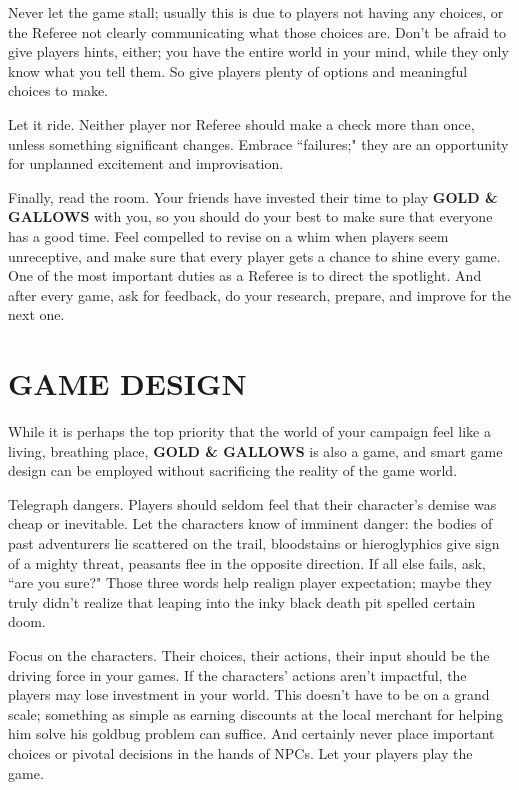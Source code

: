 \documentclass[twoside]{article}
\begin{document}
\bigbreak

Never let the game stall; usually this is due to players not having any choices, or the Referee not clearly communicating what those choices are. Don't be afraid to give players hints, either; you have the entire world in your mind, while they only know what you tell them. So give players plenty of options and meaningful choices to make.

\bigbreak

Let it ride. Neither player nor Referee should make a check more than once, unless something significant changes. Embrace ``failures;" they are an opportunity for unplanned excitement and improvisation. 


\bigbreak

Finally, read the room. Your friends have invested their time to play \textbf{GOLD \& GALLOWS} with you, so you should do your best to make sure that everyone has a good time. Feel compelled to revise on a whim when players seem unreceptive, and make sure that every player gets a chance to shine every game. One of the most important duties as a Referee is to direct the spotlight. And after every game, ask for feedback, do your research, prepare, and improve for the next one.

\section*{GAME DESIGN}

While it is perhaps the top priority that the world of your campaign feel like a living, breathing place, \textbf{GOLD \& GALLOWS} is also a game, and smart game design can be employed without sacrificing the reality of the game world.

\bigbreak

Telegraph dangers. Players should seldom feel that their character's demise was cheap or inevitable. Let the characters know of imminent danger: the bodies of past adventurers lie scattered on the trail, bloodstains or hieroglyphics give sign of a mighty threat, peasants flee in the opposite direction. If all else fails, ask, ``are you sure?" Those three words help realign player expectation; maybe they truly didn't realize that leaping into the inky black death pit spelled certain doom.

\bigbreak

Focus on the characters. Their choices, their actions, their input should be the driving force in your games. If the characters' actions aren't impactful, the players may lose investment in your world. This doesn't have to be on a grand scale; something as simple as earning discounts at the local merchant for helping him solve his goldbug problem can suffice. And certainly never place important choices or pivotal decisions in the hands of NPCs. Let your players play the game.
\end{document}
